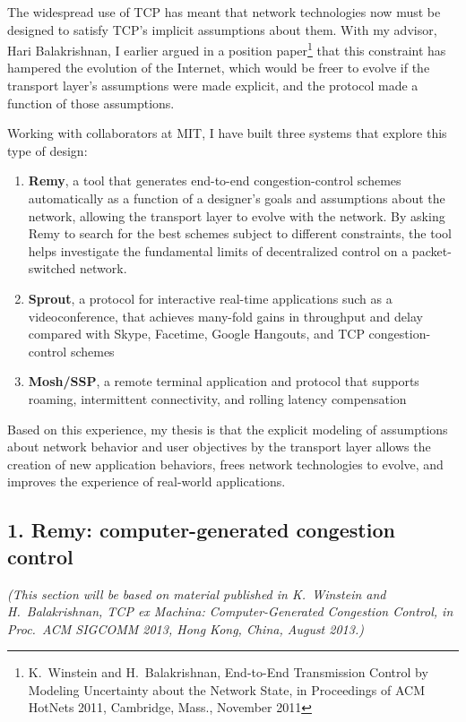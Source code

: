 \documentclass{article}
\begin{document}
The widespread use of TCP has meant that network technologies now must
be designed to satisfy TCP's implicit assumptions about them. With my
advisor, Hari Balakrishnan, I earlier argued in a position
paper\footnote{K.~Winstein and H.~Balakrishnan, End-to-End
  Transmission Control by Modeling Uncertainty about the Network
  State, in Proceedings of ACM HotNets 2011, Cambridge, Mass.,
  November 2011} that this constraint has hampered the evolution of
the Internet, which would be freer to evolve if the transport layer's
assumptions were made explicit, and the protocol made a function of
those assumptions.

Working with collaborators at MIT, I have built three
systems that explore this type of design:

\begin{enumerate}
\item \textbf{Remy}, a tool that generates end-to-end
  congestion-control schemes automatically as a function of a
  designer's goals and assumptions about the network, allowing the
  transport layer to evolve with the network. By asking Remy to search
  for the best schemes subject to different constraints, the tool
  helps investigate the fundamental limits of decentralized control on
  a packet-switched network.

\item \textbf{Sprout}, a protocol for interactive real-time
  applications such as a videoconference, that achieves many-fold gains
  in throughput and delay compared with Skype, Facetime, Google
  Hangouts, and TCP congestion-control schemes

\item \textbf{Mosh/SSP}, a remote terminal application and protocol that
  supports roaming, intermittent connectivity, and rolling latency compensation
\end{enumerate}

Based on this experience, my thesis is that the explicit modeling of
assumptions about network behavior and user objectives by the
transport layer allows the creation of new application behaviors,
frees network technologies to evolve, and improves the experience of
real-world applications.

\subsection*{1. Remy: computer-generated congestion control}

\emph{(This section will be based on material published in
  K.~Winstein and H.~Balakrishnan, TCP ex Machina: Computer-Generated Congestion Control, in Proc.~ACM SIGCOMM 2013, Hong Kong, China, August 2013.)}
\end{document}
